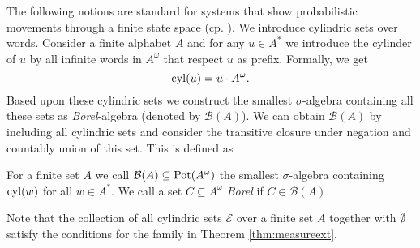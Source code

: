 The following notions are standard for systems that show probabilistic 
movements through a finite state space (cp. 
\cite{RandomnessForFree,AlgorithmsForPOSG}). We introduce cylindric sets over 
words. Consider a finite alphabet $A$ and for any $u\in A^{*}$ we introduce the 
cylinder of $u$ by all infinite words in $A^{\omega}$ that respect $u$ as 
prefix. Formally, we get
\begin{equation*}
  \operatorname{cyl}(u) = u\cdot A^{\omega}.
\end{equation*}
Based upon these cylindric sets we construct the smallest $\sigma$-algebra
containing all these sets  as \emph{Borel}-algebra (denoted by 
$\mathcal{B}(A)$). We can obtain $\mathcal{B}(A)$ by including all cylindric 
sets and consider the transitive closure under negation and countably union of 
this set. This is defined as
\begin{definition}
  For a finite set $A$ we call $\mathcal{B}(A)\subseteq\operatorname{Pot}(A^{\omega})$ the 
  smallest $\sigma$-algebra containing $\operatorname{cyl}(w)$ for all $w\in A^{*}$. We call
  a set $C\subseteq A^{\omega}$ \emph{Borel} if $C\in\mathcal{B}(A)$.
  \label{def:borelalgebra}
\end{definition}
Note that the collection of all cylindric sets $\mathcal{E}$ over a finite set
$A$ together with $\emptyset$ satisfy the conditions for the family in Theorem
\ref{thm:measureext}.

